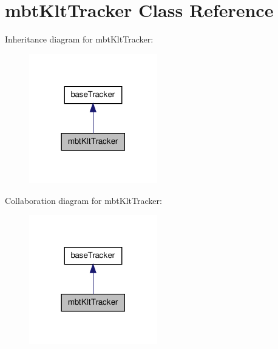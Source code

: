 \hypertarget{classmbtKltTracker}{\section{mbt\-Klt\-Tracker \-Class \-Reference}
\label{classmbtKltTracker}
}


\-Inheritance diagram for mbt\-Klt\-Tracker\-:\nopagebreak
\begin{figure}[H]
\begin{center}
\leavevmode
\includegraphics[width=158pt]{classmbtKltTracker__inherit__graph}
\end{center}
\end{figure}


\-Collaboration diagram for mbt\-Klt\-Tracker\-:\nopagebreak
\begin{figure}[H]
\begin{center}
\leavevmode
\includegraphics[width=158pt]{classmbtKltTracker__coll__graph}
\end{center}
\end{figure}
